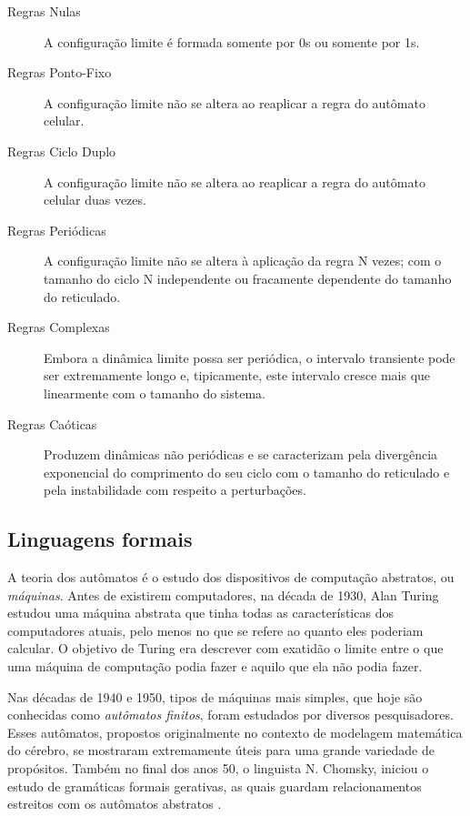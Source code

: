 \documentclass[12pt,a4paper]{article}
\begin{document}
\begin{description}
\item[Regras Nulas] A configuração limite é formada somente por 0s ou somente por 1s.

\item[Regras Ponto-Fixo] A configuração limite não se altera ao
reaplicar a regra do autômato celular.

\item[Regras Ciclo Duplo] A configuração limite não se altera ao
reaplicar a regra do autômato celular duas vezes.

\item[Regras Periódicas] A configuração limite não se altera à aplicação
da regra N vezes; com o tamanho do ciclo N independente ou fracamente
dependente do tamanho do reticulado.

\item[Regras Complexas] Embora a dinâmica limite possa ser periódica,
o intervalo transiente pode ser extremamente longo e, tipicamente,
este intervalo cresce mais que linearmente com o tamanho do sistema.

\item[Regras Caóticas] Produzem dinâmicas não periódicas e se caracterizam
pela divergência exponencial do comprimento do seu ciclo com o tamanho do
reticulado e pela instabilidade com respeito a perturbações.
\end{description}

\subsection{Linguagens formais}

A teoria dos autômatos é o estudo dos dispositivos de computação abstratos,
ou \textit{máquinas}. Antes de existirem computadores, na década de 1930, Alan
Turing estudou uma máquina abstrata que tinha todas as características dos
computadores atuais, pelo menos no que se refere ao quanto eles poderiam
calcular. O objetivo de Turing era descrever com exatidão o limite entre
o que uma máquina de computação podia fazer e aquilo que ela não podia fazer.

Nas décadas de 1940 e 1950, tipos de máquinas mais simples, que hoje são
conhecidas como \textit{autômatos finitos}, foram estudados por diversos
pesquisadores. Esses autômatos, propostos originalmente no contexto de
modelagem matemática do cérebro, se mostraram extremamente úteis para uma grande variedade
de propósitos. Também no final dos anos 50, o linguista N. Chomsky, iniciou
o estudo de gramáticas formais gerativas, as quais guardam relacionamentos
estreitos com os autômatos abstratos .
\end{document}
